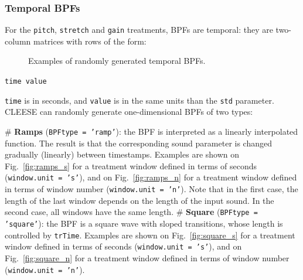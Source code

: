 \documentclass[oneside,10pt]{article}
\newcommand{\mip}{\texttt}
\newcommand{\mic}{\texttt}
\begin{document}
\subsubsection{Temporal BPFs}

For the \texttt{pitch}, \texttt{stretch} and \texttt{gain} treatments, BPFs are
temporal: they are two-column matrices  with rows of the form:

\begin{figure}[ht!]
\center
{}
\caption{Examples of randomly generated temporal BPFs.}\label{fig:bpf}
\end{figure}


\vspace{8pt}
 \mip{time value}
\vspace{8pt}

\texttt{time} is in seconds, and \texttt{value} is in the same units than the
\texttt{std} parameter. CLEESE can randomly generate one-dimensional BPFs of
two types:

\vspace{5pt}
\begin{easylist}[itemize]
# \textbf{Ramps} (\mic{BPFtype = 'ramp'}): the BPF is interpreted as a linearly
        interpolated function. The result is that the corresponding sound
        parameter is changed gradually (linearly) between timestamps. Examples
        are shown on Fig.~\ref{fig:ramps_s} for a treatment window defined in
        terms of seconds (\mic{window.unit = 's'}), and on
        Fig.~\ref{fig:ramps_n} for a treatment window defined in terms of
        window number (\mic{window.unit = 'n'}). Note that in the first case,
        the length of the last window depends on the length of the input sound.
        In the second case, all windows have the same length.
# \textbf{Square} (\mic{BPFtype = 'square'}): the BPF is a square wave with
        sloped transitions, whose length is controlled by \texttt{trTime}.
        Examples are shown on Fig.~\ref{fig:square_s} for a treatment window
        defined in terms of seconds (\mic{window.unit = 's'}), and on
        Fig.~\ref{fig:square_n} for a treatment window defined in terms of
        window number (\mic{window.unit = 'n'}).
\end{easylist}
\vspace{8pt}
\end{document}
